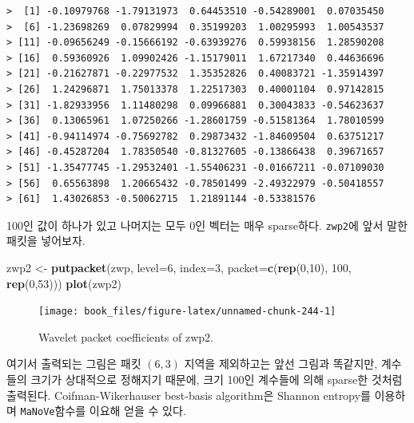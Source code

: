\documentclass[b5paper,]{scrbook}
\makeatletter
\newenvironment{Shaded}{\begin{snugshade}}{\end{snugshade}}
\newcommand{\KeywordTok}[1]{\textcolor[rgb]{0.13,0.29,0.53}{\textbf{#1}}}
\newcommand{\DataTypeTok}[1]{\textcolor[rgb]{0.13,0.29,0.53}{#1}}
\newcommand{\DecValTok}[1]{\textcolor[rgb]{0.00,0.00,0.81}{#1}}
\newcommand{\StringTok}[1]{\textcolor[rgb]{0.31,0.60,0.02}{#1}}
\newcommand{\NormalTok}[1]{#1}
\theoremstyle{plain}
\theoremstyle{definition}
\numberwithin{equation}{section}
\newenvironment{kframe}{%
\medskip{}
\setlength{\fboxsep}{.8em}
 \def\at@end@of@kframe{}%
 \ifinner\ifhmode%
  \def\at@end@of@kframe{\end{minipage}}%
  \begin{minipage}{\columnwidth}%
 \fi\fi%
 \def\FrameCommand##1{\hskip\@totalleftmargin \hskip-\fboxsep
 \colorbox{shadecolor}{##1}\hskip-\fboxsep
     \hskip-\linewidth \hskip-\@totalleftmargin \hskip\columnwidth}%
 \MakeFramed {\advance\hsize-\width
   \@totalleftmargin\z@ \linewidth\hsize
   \@setminipage}}%
 {\par\unskip\endMakeFramed%
 \at@end@of@kframe}
\renewenvironment{Shaded}{\begin{kframe}}{\end{kframe}}
\makeatother
\begin{document}
\begin{verbatim}
>  [1] -0.10979768 -1.79131973  0.64453510 -0.54289001  0.07035450
>  [6] -1.23698269  0.07829994  0.35199203  1.00295993  1.00543537
> [11] -0.09656249 -0.15666192 -0.63939276  0.59938156  1.28590208
> [16]  0.59360926  1.09902426 -1.15179011  1.67217340  0.44636696
> [21] -0.21627871 -0.22977532  1.35352826  0.40083721 -1.35914397
> [26]  1.24296871  1.75013378  1.22517303  0.40001104  0.97142815
> [31] -1.82933956  1.11480298  0.09966881  0.30043833 -0.54623637
> [36]  0.13065961  1.07250266 -1.28601759 -0.51581364  1.78010599
> [41] -0.94114974 -0.75692782  0.29873432 -1.84609504  0.63751217
> [46] -0.45287204  1.78350540 -0.81327605 -0.13866438  0.39671657
> [51] -1.35477745 -1.29532401 -1.55406231 -0.01667211 -0.07109030
> [56]  0.65563898  1.20665432 -0.78501499 -2.49322979 -0.50418557
> [61]  1.43026853 -0.50062715  1.21891144 -0.53381576
\end{verbatim}

100인 값이 하나가 있고 나머지는 모두 0인 벡터는 매우 sparse하다.
\texttt{zwp2}에 앞서 말한 패킷을 넣어보자.

\begin{Shaded}
\begin{Highlighting}[]
\NormalTok{zwp2 <-}\StringTok{ }\KeywordTok{putpacket}\NormalTok{(zwp, }\DataTypeTok{level=}\DecValTok{6}\NormalTok{, }\DataTypeTok{index=}\DecValTok{3}\NormalTok{, }\DataTypeTok{packet=}\KeywordTok{c}\NormalTok{(}\KeywordTok{rep}\NormalTok{(}\DecValTok{0}\NormalTok{,}\DecValTok{10}\NormalTok{), }\DecValTok{100}\NormalTok{, }\KeywordTok{rep}\NormalTok{(}\DecValTok{0}\NormalTok{,}\DecValTok{53}\NormalTok{)))}
\KeywordTok{plot}\NormalTok{(zwp2)}
\end{Highlighting}
\end{Shaded}

\begin{figure}

{\centering \texttt{[image: book\_files/figure-latex/unnamed-chunk-244-1]} 

}

\caption{Wavelet packet coefficients of zwp2.}\label{fig:unnamed-chunk-244}
\end{figure}

여기서 출력되는 그림은 패킷 \((6,3)\) 지역을 제외하고는 앞선 그림과
똑같지만, 계수들의 크기가 상대적으로 정해지기 때문에, 크기 100인
계수들에 의해 sparse한 것처럼 출력된다. Coifman-Wikerhauser best-basis
algorithm은 Shannon entropy를 이용하며 \texttt{MaNoVe}함수를 이요해 얻을
수 있다.
\end{document}
